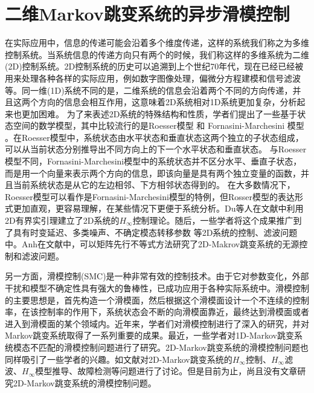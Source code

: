 
\chapter{二维Markov跳变系统的异步滑模控制}
	在实际应用中，信息的传递可能会沿着多个维度传递，这样的系统我们称之为多维控制系统。当系统信息的传递方向只有两个的时候，我们称这样的多维系统为二维(2D)控制系统。2D控制系统的历史可以追溯到上个世纪70年代，现在已经已经被用来处理各种各样的实际应用，例如数字图像处理，偏微分方程建模和信号滤波\cite{roesser1975discrete,marszalek1984two,rogers2015multidimensional}等。同一维(1D)系统不同的是，二维系统的信息会沿着两个不同的方向传递，并且这两个方向的信息会相互作用，这意味着2D系统相对1D系统更加复杂，分析起来也更加困难。 为了来表述2D系统的特殊结构和性质，学者们提出了一些基于状态空间的数学模型，其中比较流行的是Roesser模型 \cite{roesser1975discrete} 和 Fornasini-Marchesini 模型 \cite{fornasini1978doubly}。在Roesser模型中，系统状态由水平状态和垂直状态这两个独立的子状态组成，可以从当前状态分别推导出不同方向上的下一个水平状态和垂直状态。 与Roesser模型不同，Fornasini-Marchesini模型中的系统状态并不区分水平、垂直子状态，而是用一个向量来表示两个方向的信息，即该向量是具有两个独立变量的函数，并且当前系统状态是从它的左边相邻、下方相邻状态得到的。 在大多数情况下，Roesser模型可以看作是Fornasini-Marchesini模型的特例，但Rosser模型的表达形式更加直观，更容易理解，在某些情况下更便于系统分析。Du等人在文献\cite{du2001h,du2002hinfinity}中利用2D有界实引理建立了2D系统的$H_\infty$控制理论。随后，一些学者将这个成果推广到了具有时变延迟\cite{trinh2016stability}、多类噪声\cite{ahn2016stochastic}、不确定模态转移参数 \cite{chesi2016robust}等2D系统的控制、滤波问题中。Anh在文献\cite{ahn2015two}中，可以矩阵先行不等式方法研究了2D-Makrov跳变系统的无源控制和滤波问题。
	
	另一方面，滑模控制(SMC)是一种非常有效的控制技术。由于它对参数变化，外部干扰和模型不确定性具有强大的鲁棒性，已成功应用于各种实际系统中\cite{utkin2009sliding,yang1999sliding,shima2006sliding}。滑模控制的主要思想是，首先构造一个滑模面，然后根据这个滑模面设计一个不连续的控制率，在该控制率的作用下，系统状态会不断的向滑模面靠近，最终达到滑模面或者进入到滑模面的某个领域内\cite{edwards1998sliding}。近年来，学者们对滑模控制进行了深入的研究，并对Markov跳变系统取得了一系列重要的成果\cite{li2015state,wu2010state,wang2017smc}。最近，一些学者对1D-Markov跳变系统模态不匹配的滑模控制问题进行了研究\cite{song2018asynchronous,li2017passivity,qi2018observer}。2D-Markov跳变系统的滑模控制问题也同样吸引了一些学者的兴趣。如文献\cite{gao2004stabilization,wu2018hcontrol2d,wu2008hfiltering2d,wu2006modelreduction,shen2019dissipativity}对2D-Markov跳变系统的$H_\infty$控制、$H_\infty$滤波、$H_\infty$模型推导、故障检测等问题进行了讨论。但是目前为止，尚且没有文章研究2D-Markov跳变系统的滑模控制问题。
	
